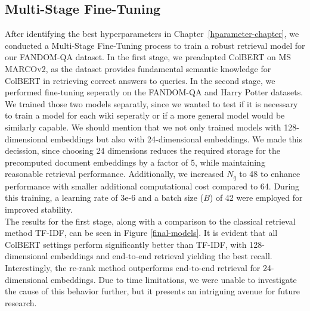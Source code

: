 \documentclass[11pt]{article}
\begin{document}
\subsection{Multi-Stage Fine-Tuning}
\label{chap:fine-tuning}
After identifying the best hyperparameters in Chapter~\ref{hparameter-chapter}, we conducted a Multi-Stage Fine-Tuning process to train a robust retrieval model for our FANDOM-QA dataset. In the first stage, we preadapted ColBERT on MS MARCOv2, as the dataset provides fundamental semantic knowledge for ColBERT in retrieving correct answers to queries. In the second stage, we performed fine-tuning seperatly on the FANDOM-QA and Harry Potter datasets. We trained those two models separatly, since we wanted to test if it is necessary to train a model for each wiki seperatly or if a more general model would be similarly capable. 
We should mention that we not only trained models with 128-dimensional embeddings but also with 24-dimensional embeddings. We made this decission, since choosing 24 dimensions reduces the required storage for the precomputed document embeddings by a factor of 5, while maintaining reasonable retrieval performance. Additionally, we increased $N_q$ to 48 to enhance performance with smaller additional computational cost compared to 64. During this training, a learning rate of 3e-6 and a batch size ($B$) of 42 were employed for improved stability. \\
The results for the first stage, along with a comparison to the classical retrieval method TF-IDF, can be seen in Figure \ref{final-models}. It is evident that all ColBERT settings perform significantly better than TF-IDF, with 128-dimensional embeddings and end-to-end retrieval yielding the best recall. Interestingly, the re-rank method outperforms end-to-end retrieval for 24-dimensional embeddings. Due to time limitations, we were unable to investigate the cause of this behavior further, but it presents an intriguing avenue for future research.
\end{document}
